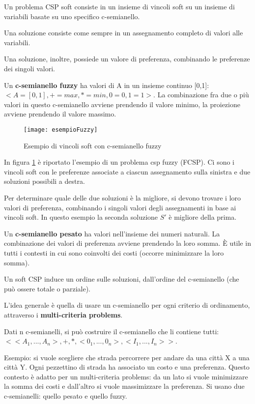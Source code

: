 Un problema CSP soft consiste in un insieme di vincoli soft su un insieme di
variabili basate su uno specifico c-semianello.

Una soluzione consiste come sempre in un assegnamento completo di valori alle
variabili.

Una soluzione, inoltre, possiede un valore di preferenza, combinando le
preferenze dei singoli valori.

Un \textbf{c-semianello fuzzy} ha valori di A in un insieme continuo [0,1]:
$<A = [0,1], + = max, * = min, 0 = 0, 1 = 1>$. La combinazione fra due o
più valori in questo c-semianello avviene prendendo il valore minimo,
la proiezione avviene prendendo il valore massimo.

\begin{figure}[H]
\centering
\texttt{[image: esempioFuzzy]}
\caption{Esempio di vincoli soft con c-semianello fuzzy}
\label{fig:esempioFuzzy}
\end{figure}

In figura \ref{fig:esempioFuzzy} è riportato l'esempio di un problema
csp fuzzy (FCSP). Ci sono i vincoli soft con le preferenze associate a
ciascun assegnamento sulla sinistra e due soluzioni possibili a destra.

Per determinare quale delle due soluzioni è la migliore, si devono trovare
i loro valori di preferenza, combinando i singoli valori degli assegnamenti
in base ai vincoli soft. In questo esempio la seconda soluzione $S'$ è
migliore della prima.

Un \textbf{c-semianello pesato} ha valori nell'insieme dei numeri naturali.
La combinazione dei valori di preferenza avviene prendendo la loro somma.
È utile in tutti i contesti in cui sono coinvolti dei costi (occorre
minimizzare la loro somma).

Un soft CSP induce un ordine sulle soluzioni, dall'ordine del c-semianello
(che può ossere totale o parziale).

L'idea generale è quella di usare un c-semianello per ogni criterio di
ordinamento, attraverso i \textbf{multi-criteria problems}.

Dati n c-semianelli, si può costruire il c-semianello che li contiene
tutti:
$<<A_1,...,A_n>, +, *, <0_1,...,0_n>,<I_1,...,I_n>>$.

Esempio: si vuole scegliere che strada percorrere per andare da una città
X a una città Y. Ogni pezzettino di strada ha associato un costo e una
preferenza.
Questo contesto è adatto per un multi-criteria problems: da un lato si
vuole minimizzare la somma dei costi e dall'altro si vuole massimizzare
la preferenza. Si usano due c-semianelli: quello pesato e quello fuzzy.

